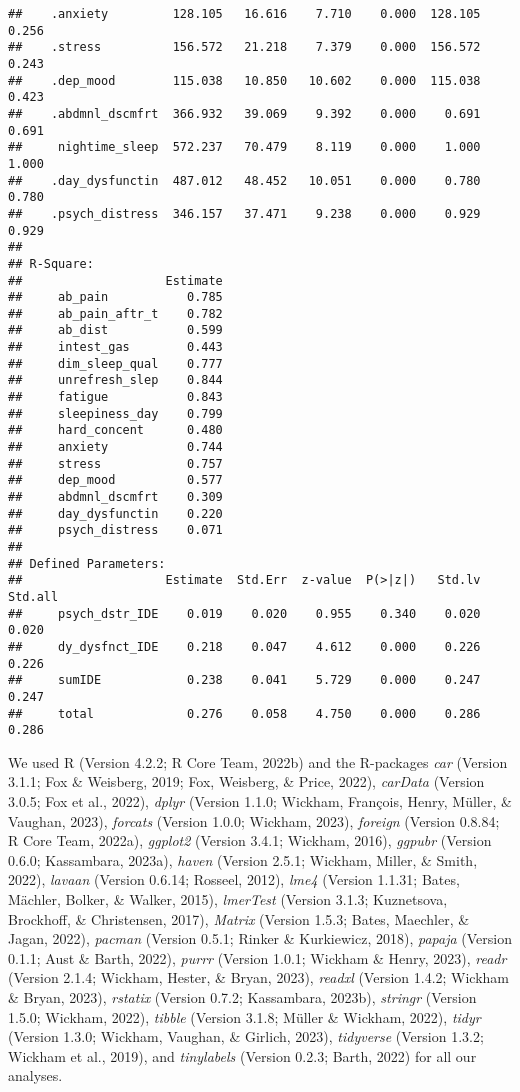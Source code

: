 \documentclass[
  man]{apa6}
\begin{document}
\begin{verbatim}
##    .anxiety         128.105   16.616    7.710    0.000  128.105    0.256
##    .stress          156.572   21.218    7.379    0.000  156.572    0.243
##    .dep_mood        115.038   10.850   10.602    0.000  115.038    0.423
##    .abdmnl_dscmfrt  366.932   39.069    9.392    0.000    0.691    0.691
##     nightime_sleep  572.237   70.479    8.119    0.000    1.000    1.000
##    .day_dysfunctin  487.012   48.452   10.051    0.000    0.780    0.780
##    .psych_distress  346.157   37.471    9.238    0.000    0.929    0.929
## 
## R-Square:
##                    Estimate
##     ab_pain           0.785
##     ab_pain_aftr_t    0.782
##     ab_dist           0.599
##     intest_gas        0.443
##     dim_sleep_qual    0.777
##     unrefresh_slep    0.844
##     fatigue           0.843
##     sleepiness_day    0.799
##     hard_concent      0.480
##     anxiety           0.744
##     stress            0.757
##     dep_mood          0.577
##     abdmnl_dscmfrt    0.309
##     day_dysfunctin    0.220
##     psych_distress    0.071
## 
## Defined Parameters:
##                    Estimate  Std.Err  z-value  P(>|z|)   Std.lv  Std.all
##     psych_dstr_IDE    0.019    0.020    0.955    0.340    0.020    0.020
##     dy_dysfnct_IDE    0.218    0.047    4.612    0.000    0.226    0.226
##     sumIDE            0.238    0.041    5.729    0.000    0.247    0.247
##     total             0.276    0.058    4.750    0.000    0.286    0.286
\end{verbatim}

We used R (Version 4.2.2; R Core Team, 2022b) and the R-packages \emph{car} (Version 3.1.1; Fox \& Weisberg, 2019; Fox, Weisberg, \& Price, 2022), \emph{carData} (Version 3.0.5; Fox et al., 2022), \emph{dplyr} (Version 1.1.0; Wickham, François, Henry, Müller, \& Vaughan, 2023), \emph{forcats} (Version 1.0.0; Wickham, 2023), \emph{foreign} (Version 0.8.84; R Core Team, 2022a), \emph{ggplot2} (Version 3.4.1; Wickham, 2016), \emph{ggpubr} (Version 0.6.0; Kassambara, 2023a), \emph{haven} (Version 2.5.1; Wickham, Miller, \& Smith, 2022), \emph{lavaan} (Version 0.6.14; Rosseel, 2012), \emph{lme4} (Version 1.1.31; Bates, Mächler, Bolker, \& Walker, 2015), \emph{lmerTest} (Version 3.1.3; Kuznetsova, Brockhoff, \& Christensen, 2017), \emph{Matrix} (Version 1.5.3; Bates, Maechler, \& Jagan, 2022), \emph{pacman} (Version 0.5.1; Rinker \& Kurkiewicz, 2018), \emph{papaja} (Version 0.1.1; Aust \& Barth, 2022), \emph{purrr} (Version 1.0.1; Wickham \& Henry, 2023), \emph{readr} (Version 2.1.4; Wickham, Hester, \& Bryan, 2023), \emph{readxl} (Version 1.4.2; Wickham \& Bryan, 2023), \emph{rstatix} (Version 0.7.2; Kassambara, 2023b), \emph{stringr} (Version 1.5.0; Wickham, 2022), \emph{tibble} (Version 3.1.8; Müller \& Wickham, 2022), \emph{tidyr} (Version 1.3.0; Wickham, Vaughan, \& Girlich, 2023), \emph{tidyverse} (Version 1.3.2; Wickham et al., 2019), and \emph{tinylabels} (Version 0.2.3; Barth, 2022) for all our analyses.
\end{document}
